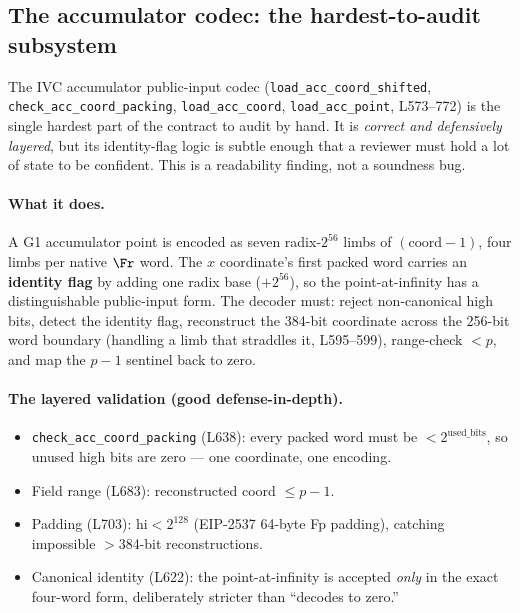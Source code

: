 \subsection{The accumulator codec: the hardest-to-audit subsystem}
\label{sec:pr-acc-codec}

The IVC accumulator public-input codec
(\texttt{load\_\allowbreak{}acc\_\allowbreak{}coord\_\allowbreak{}shifted}, \texttt{check\_\allowbreak{}acc\_\allowbreak{}coord\_\allowbreak{}packing},
\texttt{load\_acc\_coord}, \texttt{load\_acc\_point},
L573--772) is the single hardest part of the contract to audit
by hand. It is \emph{correct and defensively layered}, but its
identity-flag logic is subtle enough that a reviewer must hold a
lot of state to be confident. This is a readability finding, not
a soundness bug.

\paragraph{What it does.} A G1 accumulator point is encoded as
seven radix-$2^{56}$ limbs of $(\text{coord} - 1)$, four limbs
per native $\Fr$ word. The $x$ coordinate's first packed word
carries an \textbf{identity flag} by adding one radix base
($+2^{56}$), so the point-at-infinity has a distinguishable
public-input form. The decoder must: reject non-canonical high
bits, detect the identity flag, reconstruct the 384-bit
coordinate across the 256-bit word boundary (handling a limb
that straddles it, L595--599), range-check $< p$, and map the
$p{-}1$ sentinel back to zero.

\paragraph{The layered validation (good defense-in-depth).}
\begin{itemize}[leftmargin=1.4em,itemsep=2pt]
\item \texttt{check\_\allowbreak{}acc\_\allowbreak{}coord\_\allowbreak{}packing} (L638): every packed
  word must be $< 2^{\text{used\_bits}}$, so unused high bits
  are zero --- one coordinate, one encoding.
\item Field range (L683): reconstructed coord $\le p-1$.
\item Padding (L703): $\text{hi} < 2^{128}$ (EIP-2537 64-byte
  Fp padding), catching impossible $>$384-bit reconstructions.
\item Canonical identity (L622): the point-at-infinity is
  accepted \emph{only} in the exact four-word form, deliberately
  stricter than ``decodes to zero.''
\end{itemize}

